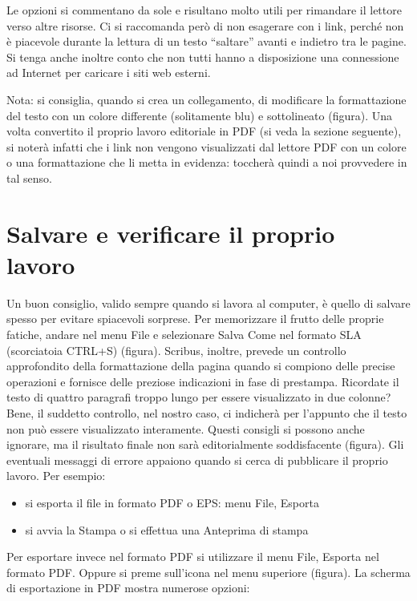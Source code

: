 \documentclass[a4paper, 12pt]{book}
\begin{document}
Le opzioni si commentano da sole e risultano molto utili per rimandare il lettore verso altre risorse. Ci si raccomanda però di non esagerare con i link, perché non è piacevole durante la lettura di un testo “saltare” avanti e indietro tra le pagine. Si tenga anche inoltre conto che non tutti hanno a disposizione una connessione ad Internet per caricare i siti web esterni.

Nota: si consiglia, quando si crea un collegamento, di modificare la formattazione del testo con un colore differente (solitamente blu) e sottolineato (figura). Una volta convertito il proprio lavoro editoriale in PDF (si veda la sezione seguente), si noterà infatti che i link non vengono visualizzati dal lettore PDF con un colore o una formattazione che li metta in evidenza: toccherà quindi a noi provvedere in tal senso.

\section{Salvare e verificare il proprio lavoro}
Un buon consiglio, valido sempre quando si lavora al computer, è quello di salvare spesso per evitare spiacevoli sorprese. Per memorizzare il frutto delle proprie fatiche, andare nel menu File e selezionare Salva Come nel formato SLA (scorciatoia CTRL+S) (figura). 
Scribus, inoltre, prevede un controllo approfondito della formattazione della pagina quando si compiono delle precise operazioni e fornisce delle preziose indicazioni in fase di prestampa. Ricordate il testo di quattro paragrafi troppo lungo per essere visualizzato in due colonne? Bene, il suddetto controllo, nel nostro caso, ci indicherà per l'appunto che il testo non può essere visualizzato interamente. Questi consigli si possono anche ignorare, ma il risultato finale non sarà editorialmente soddisfacente (figura).
Gli eventuali messaggi di errore appaiono quando si cerca di pubblicare il proprio lavoro. Per esempio:

\begin{itemize}
	\item si esporta il file in formato PDF o EPS: menu File, Esporta

	\item si avvia la Stampa o si effettua una Anteprima di stampa

\end{itemize}

Per esportare invece nel formato PDF si utilizzare il menu File, Esporta nel formato PDF. Oppure si preme sull'icona nel menu superiore (figura). La scherma di esportazione in PDF mostra numerose opzioni:
\end{document}
